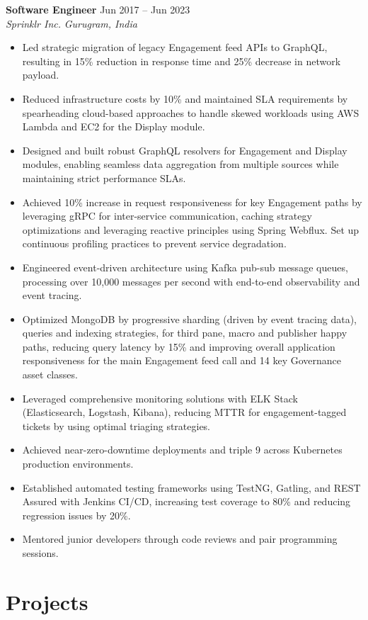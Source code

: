 \documentclass[10pt,letterpaper]{article}
\newcommand{\role}[4]{%
  \vspace{2pt}
  \noindent\textbf{#1} \hfill #2 \\
  \textit{#3} \hfill \textit{#4}
  \vspace{1pt}
}
\begin{document}
\role{Software Engineer}{Jun 2017 -- Jun 2023}{Sprinklr Inc.}{Gurugram, India}
\begin{itemize}
  \item Led strategic migration of legacy Engagement feed APIs to GraphQL, resulting in 15\% reduction in response time and 25\% decrease in network payload.
  \item Reduced infrastructure costs by 10\% and maintained SLA requirements by spearheading cloud-based approaches to handle skewed workloads using AWS Lambda and EC2 for the Display module.
  \item Designed and built robust GraphQL resolvers for Engagement and Display modules, enabling seamless data aggregation from multiple sources while maintaining strict performance SLAs.
  \item Achieved 10\% increase in request responsiveness for key Engagement paths by leveraging gRPC for inter-service communication, caching strategy optimizations and leveraging reactive principles using Spring Webflux. Set up continuous profiling practices to prevent service degradation.
  \item Engineered event-driven architecture using Kafka pub-sub message queues, processing over 10,000 messages per second with end-to-end observability and event tracing.
  \item Optimized MongoDB by progressive sharding (driven by event tracing data), queries and indexing strategies, for third pane, macro and publisher happy paths, reducing query latency by 15\% and improving overall application responsiveness for the main Engagement feed call and 14 key Governance asset classes.
  \item Leveraged comprehensive monitoring solutions with ELK Stack (Elasticsearch, Logstash, Kibana), reducing MTTR for engagement-tagged tickets by using optimal triaging strategies.
  \item Achieved near-zero-downtime deployments and triple 9 across Kubernetes production environments.
  \item Established automated testing frameworks using TestNG, Gatling, and REST Assured with Jenkins CI/CD, increasing test coverage to 80\% and reducing regression issues by 20\%.
  \item Mentored junior developers through code reviews and pair programming sessions.
\end{itemize}

\section{Projects}
\end{document}
